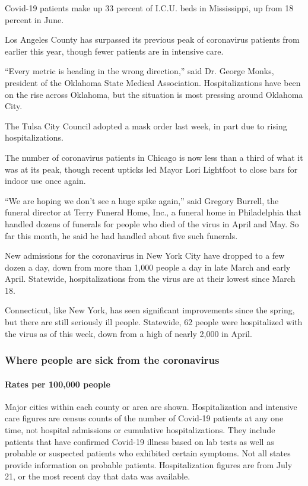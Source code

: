Covid-19 patients make up 33 percent of I.C.U. beds in Mississippi, up
from 18 percent in June.

Los Angeles County has surpassed its previous peak of coronavirus
patients from earlier this year, though fewer patients are in intensive
care.

``Every metric is heading in the wrong direction,'' said Dr. George
Monks, president of the Oklahoma State Medical Association.
Hospitalizations have been on the rise across Oklahoma, but the
situation is most pressing around Oklahoma City.

The Tulsa City Council adopted a mask order last week, in part due to
rising hospitalizations.

The number of coronavirus patients in Chicago is now less than a third
of what it was at its peak, though recent upticks led Mayor Lori
Lightfoot to close bars for indoor use once again.

``We are hoping we don't see a huge spike again,'' said Gregory Burrell,
the funeral director at Terry Funeral Home, Inc., a funeral home in
Philadelphia that handled dozens of funerals for people who died of the
virus in April and May. So far this month, he said he had handled about
five such funerals.

New admissions for the coronavirus in New York City have dropped to a
few dozen a day, down from more than 1,000 people a day in late March
and early April. Statewide, hospitalizations from the virus are at their
lowest since March 18.

Connecticut, like New York, has seen significant improvements since the
spring, but there are still seriously ill people. Statewide, 62 people
were hospitalized with the virus as of this week, down from a high of
nearly 2,000 in April.

\hypertarget{where-people-are-sick-from-the-coronavirus}{%
\subsubsection{Where people are sick from the
coronavirus}\label{where-people-are-sick-from-the-coronavirus}}

\hypertarget{rates-per-100000-people}{%
\paragraph{Rates per 100,000 people}\label{rates-per-100000-people}}

Major cities within each county or area are shown. Hospitalization and
intensive care figures are census counts of the number of Covid-19
patients at any one time, not hospital admissions or cumulative
hospitalizations. They include patients that have confirmed Covid-19
illness based on lab tests as well as probable or suspected patients who
exhibited certain symptoms. Not all states provide information on
probable patients. Hospitalization figures are from July 21, or the most
recent day that data was available.

